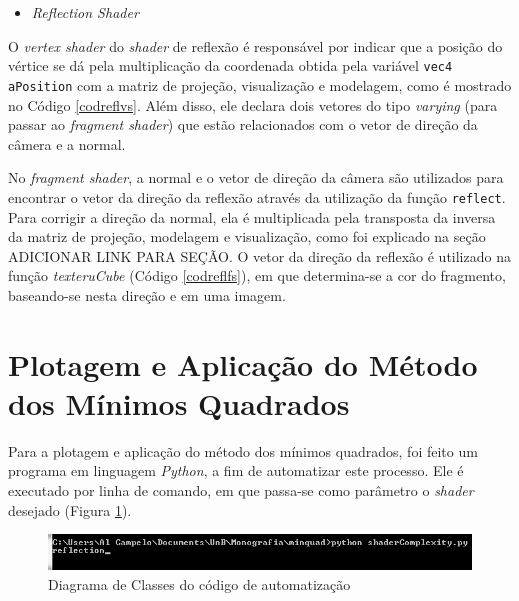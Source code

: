 	
	
	\begin{itemize}
  	\item \textit{Reflection Shader}
	\end{itemize}

	O \textit{vertex shader} do \textit{shader} de reflexão é responsável por indicar que a posição do vértice se dá pela multiplicação da coordenada obtida pela variável \texttt{vec4 aPosition} com a matriz de projeção, visualização e modelagem, como é mostrado no Código \ref{codreflvs}. Além disso, ele declara dois vetores do tipo \textit{varying} (para passar ao \textit{fragment shader}) que estão relacionados com o vetor de direção da câmera e a normal. 

	

	No \textit{fragment shader}, a normal e o vetor de direção da câmera são utilizados para encontrar o vetor da direção da reflexão através da utilização da função \texttt{reflect}. Para corrigir a direção da normal, ela é multiplicada pela transposta da inversa da matriz de projeção, modelagem e visualização, como foi explicado na seção ADICIONAR LINK PARA SEÇÃO. O vetor da direção da reflexão é utilizado na função \textit{texteruCube} (Código \ref{codreflfs}), em que determina-se a cor do fragmento, baseando-se nesta direção e em uma imagem. 

	

\section{Plotagem e Aplicação do Método dos Mínimos Quadrados}

	Para a plotagem e aplicação do método dos mínimos quadrados, foi feito um programa em linguagem \textit{Python}, a fim de automatizar este processo. Ele é executado por linha de comando, em que passa-se como parâmetro o \textit{shader} desejado (Figura \ref{linhacomando}).

	\begin{figure}[h]
	\centering
		\includegraphics[keepaspectratio=true,scale=1.0]{figuras/linhacomando.jpg}
	\caption{Diagrama de Classes do código de automatização}
	\label{linhacomando}
	\end{figure}

